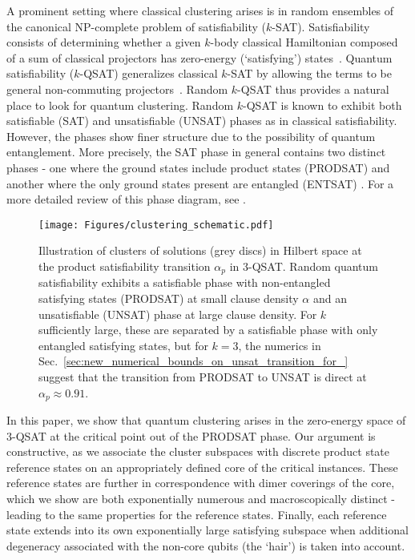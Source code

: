 \documentclass[aps,pra,twocolumn,superscriptaddress,amsmath]{revtex4-1}
\begin{document}
A prominent setting where classical clustering arises is in random ensembles of the canonical NP-complete problem of satisfiability ($k$-SAT).
Satisfiability consists of determining whether a given $k$-body classical Hamiltonian composed of a sum of classical projectors has zero-energy (`satisfying') states~\cite{Mezard2005}. 
Quantum satisfiability ($k$-QSAT) generalizes classical $k$-SAT by allowing the terms to be general non-commuting projectors~\cite{Bravyi2006}.
Random $k$-QSAT thus provides a natural place to look for quantum clustering.
Random $k$-QSAT is known to exhibit both satisfiable (SAT) and unsatisfiable (UNSAT) phases as in classical satisfiability.
However, the phases show finer structure due to the possibility of quantum entanglement. 
More precisely, the SAT phase in general contains two distinct phases - one where the ground states include product states (PRODSAT) \cite{LaumannQSAT2010,LaumannQSAT2010_2} and another where the only ground states present are entangled (ENTSAT) \cite{Ambainis2012}. 
For a more detailed review of this phase diagram, see \cite{Sattath2016,Hsu2013,Bravyi:2009p7817}.

\begin{figure}
 	\texttt{[image: Figures/clustering\_schematic.pdf]}
	\caption{
    \label{fig:clusteringSchematic} 
    Illustration of clusters of solutions (grey discs) in Hilbert space at the product satisfiability transition $\alpha_p$ in 3-QSAT.
    Random quantum satisfiability exhibits a satisfiable phase with non-entangled satisfying states  (PRODSAT) at small clause density $\alpha$ and an unsatisfiable (UNSAT) phase at large clause density. For $k$ sufficiently large, these are separated by a satisfiable phase with only entangled satisfying states, but for $k=3$, the numerics in Sec.~\ref{sec:new_numerical_bounds_on_unsat_transition_for_} suggest that the transition from PRODSAT to UNSAT is direct at $\alpha_{p} \approx 0.91$. 
    }
\end{figure}


In this paper, we show that quantum clustering arises in the zero-energy space of 3-QSAT at the critical point out of the PRODSAT phase. 
Our argument is constructive, as we associate the cluster subspaces with discrete product state reference states on an appropriately defined core of the critical instances. 
These reference states are further in correspondence with dimer coverings of the core, which we show are both exponentially numerous and macroscopically distinct - leading to the same properties for the reference states. 
Finally, each reference state extends into its own exponentially large satisfying subspace when additional degeneracy associated with the non-core qubits (the `hair') is taken into account.
\end{document}
